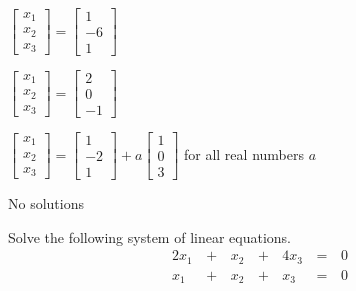 \documentclass{article}
\begin{document}
\begin{readinessAssuranceTest}
  \begin{multicols}{2}
  \begin{readinessAssuranceTestChoices}
  \item \(
          \begin{bmatrix}
            x_1 \\ x_2 \\ x_3
          \end{bmatrix}=
          \begin{bmatrix}
            1 \\ -6 \\ 1
          \end{bmatrix}
        \)
  \item \(
          \begin{bmatrix}
            x_1 \\ x_2 \\ x_3
          \end{bmatrix}=
          \begin{bmatrix}
            2 \\ 0 \\ -1
          \end{bmatrix}
        \) %
  \item \(
          \begin{bmatrix}
            x_1 \\ x_2 \\ x_3
          \end{bmatrix}=
          \begin{bmatrix}
            1 \\ -2 \\ 1
          \end{bmatrix}+
          a
          \begin{bmatrix}
            1 \\ 0 \\ 3
          \end{bmatrix}
        \) for all real numbers \(a\)
  \item No solutions
  \end{readinessAssuranceTestChoices}
  \end{multicols}

  \item Solve the following system of linear equations.
  \begin{alignat*}{4}
    2x_1 &\,+\,& x_2 &\,+\,& 4x_3 &\,=\,& 0 \\
     x_1 &\,+\,& x_2 &\,+\,&  x_3 &\,=\,& 0 \\
  \end{alignat*}


\end{readinessAssuranceTest}
\end{document}

